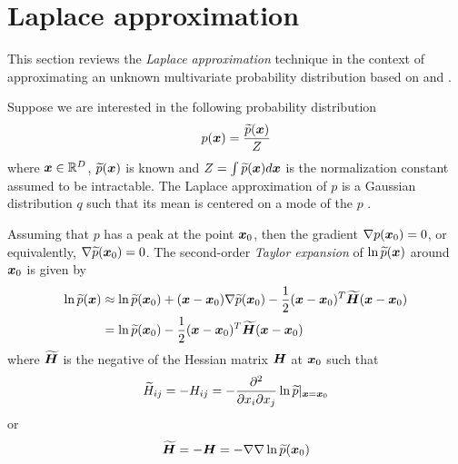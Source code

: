 \section{Laplace approximation}
\label{sec-laplace-approximation}

This section reviews the \emph{Laplace approximation}  technique in the context of approximating an unknown multivariate probability distribution based on \cite[]{bishop2006pattern} and \cite[]{mackay2003information}.

Suppose we are interested in the following probability distribution 
\begin{align}
    p(\boldsymbol{x}) = \frac{\widetilde{p}(\boldsymbol{x})}{Z}
\end{align}
where $\boldsymbol{x} \in \mathbb{R}^D$, $\widetilde{p}(\boldsymbol{x})$ is known and $Z = \int{\widetilde{p}(\boldsymbol{x})d\boldsymbol{x}}$ is the normalization constant assumed to be intractable.
The Laplace approximation of $p$ is a Gaussian distribution $q$ such that its mean is centered on a mode of the $p$ \citep{mackay2003information}. 

Assuming that $p$ has a peak at the point $\boldsymbol{x}_0$, then the gradient $\nabla p(\boldsymbol{x}_0) = 0$, or equivalently, $\nabla\widetilde{p}(\boldsymbol{x}_0) = 0$. 
The second-order \emph{Taylor expansion} of $\ln{\widetilde{p}(\boldsymbol{x})}$ around $\boldsymbol{x}_0$ is given by
\begin{align}
    \ln{\widetilde{p}(\boldsymbol{x})} 
    & \approx \ln{\widetilde{p}(\boldsymbol{x}_0)} 
        + (\boldsymbol{x} - \boldsymbol{x}_0)\nabla \widetilde{p}(\boldsymbol{x}_0)
        - \frac{1}{2}(\boldsymbol{x} - \boldsymbol{x}_0)^T\boldsymbol{\widetilde{H}}(\boldsymbol{x} - \boldsymbol{x}_0)
    \nonumber
    \\
    & = \ln{\widetilde{p}(\boldsymbol{x}_0)}
        - \frac{1}{2}(\boldsymbol{x} - \boldsymbol{x}_0)^T\boldsymbol{\widetilde{H}}(\boldsymbol{x} - \boldsymbol{x}_0)
    \label{eq-laplace-p-log}
\end{align}
where $\boldsymbol{\widetilde{H}}$ is the negative of the Hessian matrix $\boldsymbol{H}$ at $\boldsymbol{x}_0$ such that 
\begin{align}   
    \widetilde{H}_{ij} = -H_{ij} = -\frac{\partial^2}{\partial x_i \partial x_j}\ln{\widetilde{p}}\vert_{\boldsymbol{x} = \boldsymbol{x}_0}      
\end{align}
or 
\begin{align}
    \boldsymbol{\widetilde{H}} = -\boldsymbol{H} = -\nabla\nabla\ln{\widetilde{p}}(\boldsymbol{x}_0)    
\end{align}


